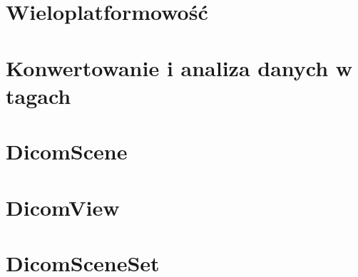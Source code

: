 
\section{Wieloplatformowość}


\section{Konwertowanie i analiza danych w tagach}


\section{DicomScene}


\section{DicomView}


\section{DicomSceneSet}


